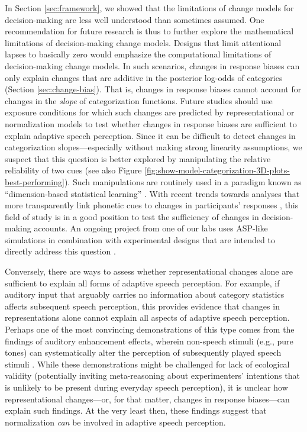 \documentclass[
  11pt,
  man,floatsintext]{apa6}
\begin{document}
In Section \ref{sec:framework}, we showed that the limitations of change models for decision-making are less well understood than sometimes assumed. One recommendation for future research is thus to further explore the mathematical limitations of decision-making change models. Designs that limit attentional lapses to basically zero \autocites[e.g., by employing more engaging tasks, as in gamified paradigms,][]{wade-holt2005,lim-holt2011} would emphasize the computational limitations of decision-making change models. In such scenarios, changes in response biases can only explain changes that are additive in the posterior log-odds of categories (Section \ref{sec:change-bias}). That is, changes in response biases cannot account for changes in the \emph{slope} of categorization functions. Future studies should use exposure conditions for which such changes are predicted by representational or normalization models to test whether changes in response biases are sufficient to explain adaptive speech perception. Since it can be difficult to detect changes in categorization slopes---especially without making strong linearity assumptions, we suspect that this question is better explored by manipulating the relative reliability of two cues (see also Figure \ref{fig:show-model-categorization-3D-plots-best-performing}). Such manipulations are routinely used in a paradigm known as ``dimension-based statistical learning'' \autocite{idemaru-holt2011,lehet-holt2020,liu-holt2015}. With recent trends towards analyses that more transparently link phonetic cues to changes in participants' responses \autocites{idemaru-holt2020}[see also Section \ref{sec:methodological-advances}]{schertz-clare2020}, this field of study is in a good position to test the sufficiency of changes in decision-making accounts. An ongoing project from one of our labs uses ASP-like simulations in combination with experimental designs that are intended to directly address this question \autocite{burchill-jaeger2022}.

Conversely, there are ways to assess whether representational changes alone are sufficient to explain all forms of adaptive speech perception. For example, if auditory input that arguably carries no information about category statistics affects subsequent speech perception, this provides evidence that changes in representations alone cannot explain all aspects of adaptive speech perception. Perhaps one of the most convincing demonstrations of this type comes from the findings of auditory enhancement effects, wherein non-speech stimuli (e.g., pure tones) can systematically alter the perception of subsequently played speech stimuli \autocites{chodroff-wilson2020,holt2001,holt2005,holt2006,huang-holt2011}[for review, see also][]{weatherholtz-jaeger2016}. While these demonstrations might be challenged for lack of ecological validity (potentially inviting meta-reasoning about experimenters' intentions that is unlikely to be present during everyday speech perception), it is unclear how representational changes---or, for that matter, changes in response biases---can explain such findings. At the very least then, these findings suggest that normalization \emph{can} be involved in adaptive speech perception.
\end{document}
